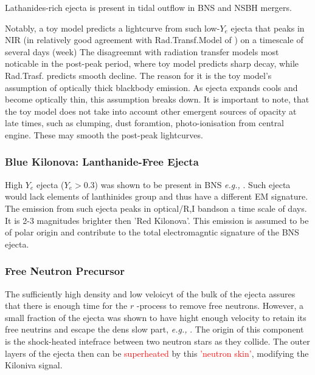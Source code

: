 \documentclass[11pt,a4paper,headinclude=true,DIV=14,BCOR=8mm,chapterprefix,listof=totoc,twoside,openright,abstracton]{scrbook}
\newcommand{\red}[1]{\textcolor{red}{#1}}
\begin{document}
Lathanides-rich ejecta is present in tidal outflow in BNS and NSBH mergers.

Notably, a toy model predicts a lightcurve from such low-$Y_e$ ejecta that peaks in NIR (in relatively good agreement with Rad.Transf.Model of \cite{Barnes et al (2016)}) on a timescale of several days (week)
The disagreemnt with radiation transfer models most noticable in the post-peak period, where toy model predicts sharp decay, while Rad.Trasf. predicts smooth decline. The reason for it is the toy model's assumption of optically thick blackbody emission. As ejecta expands cools and become optically thin, this assumption breaks down.
It is important to note, that the toy model does not take into account other emergent sources of opacity at late times, such as clumping, dust foramtion, photo-ionisation from central engine. These may smooth the post-peak lightcurves.

\subsubsection{Blue Kilonova: Lanthanide-Free Ejecta}

High $Y_e$ ejecta ($Y_e > 0.3$) was shown to be present in BNS \textit{e.g.,} \cite{Wanajo et al 2014b; Goriely et al 2015)}. Such ejecta would lack elements of lanthinides group \cite{(Metzger and Fernandez 2014)} and thus have a different EM signature.
The emission from such ejecta peaks in optical/R,I bandson a time scale of days. It is 2-3 magnitudes brighter then 'Red Kilonova'. 
This emission is assumed to be of polar origin and contribute to the total electromagntic signature of the BNS ejecta. 

\subsubsection{Free Neutron Precursor}

The sufficiently high density and low veloicyt of the bulk of the ejecta assures that there is enough time for the $r$
-process to remove free neutrons. However, a small fraction of the ejecta was shown to have hight enough velocity to retain its free neutrins and escape the dens slow part, \textit{e.g.,} \cite{(Bauswein et al 2013a)}. The origin of this component is the shock-heated intefrace between two neutron stars as they collide. 
The outer layers of the ejecta then can be \red{superheated} by this \red{'neutron skin'}, modifying the Kiloniva signal. \cite{(Metzger et al 2015a; Lippuner and Roberts 2015)}
\end{document}
